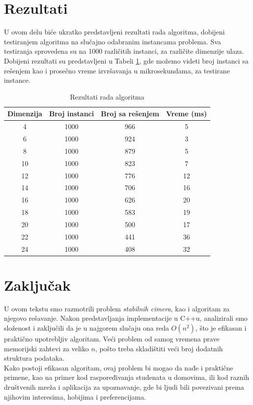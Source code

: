\documentclass[a4paper]{article}
\begin{document}
\section{Rezultati}
U ovom delu biće ukratko predstavljeni rezultati rada algoritma, dobijeni testiranjem algoritma na slučajno odabranim instancama problema. Sva testiranja sprovedena su na 1000 različitih instanci, za različite dimenzije ulaza. Dobijeni rezultati su predstavljeni u Tabeli \ref{tab:problemi}, gde možemo videti broj instanci sa rešenjem kao i prosečno vreme izvršavanja u mikrosekundama, za testirane instance.

\begin{table}[H]
  \centering
  \begin{tabular}{cccc}
    \toprule
    Dimenzija & Broj instanci & Broj sa rešenjem & Vreme (ms)\\
    \midrule
    4 & 1000 & 966 & 5 \\
    6 & 1000 & 924 & 3 \\
    8 & 1000 & 879 & 5 \\
    10 & 1000 & 823 & 7 \\
    12 & 1000 & 776 & 12 \\
    14 & 1000 & 706 & 16 \\
    16 & 1000 & 626 & 20 \\
    18 & 1000 & 583 & 19 \\
    20 & 1000 & 500 & 17 \\
    22 & 1000 & 441 & 36 \\
    24 & 1000 & 408 & 32 \\
    \bottomrule
  \end{tabular}
  \caption{Rezultati rada algoritma}
  \label{tab:problemi}
\end{table}

\section{Zaključak}
\label{sec:zakljucak}

U ovom tekstu smo razmotrili problem \textit{stabilnih cimera}, kao i algoritam za njegovo rešavanje. Nakon predstavljanja implementacije u C++u, analizirali smo složenost i zaključili da je u najgorem slučaju ona reda $O(n^2)$, što je efikasan i praktično upotrebljiv algoritam. Veći problem od samog vremena prave memorijski zahtevi za veliko $n$, pošto treba skladištiti veći broj dodatnih struktura podataka.\\
Kako postoji efikasan algoritam, ovaj problem bi mogao da nađe i praktične primene, kao na primer kod raspoređivanja studenata u domovima, ili kod raznih društvenih mreža i aplikacija za upoznavanje, gde bi ljudi bili povezivani prema njihovim interesima, hobijima i preferencijama.




\appendix
 

\end{document}
